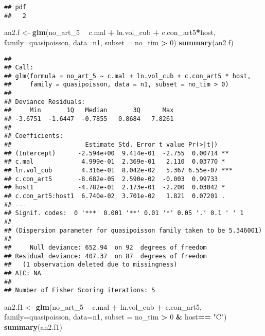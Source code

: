 \documentclass[]{article}
\newenvironment{Shaded}{\begin{snugshade}}{\end{snugshade}}
\newcommand{\KeywordTok}[1]{\textcolor[rgb]{0.13,0.29,0.53}{\textbf{#1}}}
\newcommand{\DataTypeTok}[1]{\textcolor[rgb]{0.13,0.29,0.53}{#1}}
\newcommand{\DecValTok}[1]{\textcolor[rgb]{0.00,0.00,0.81}{#1}}
\newcommand{\StringTok}[1]{\textcolor[rgb]{0.31,0.60,0.02}{#1}}
\newcommand{\OperatorTok}[1]{\textcolor[rgb]{0.81,0.36,0.00}{\textbf{#1}}}
\newcommand{\NormalTok}[1]{#1}
\begin{document}
\begin{verbatim}
## pdf 
##   2
\end{verbatim}

\begin{Shaded}
\begin{Highlighting}[]
\NormalTok{an2.f <-}\StringTok{ }\KeywordTok{glm}\NormalTok{(no_art_}\DecValTok{5} \OperatorTok{~}\StringTok{ }\NormalTok{c.mal }\OperatorTok{+}\StringTok{ }\NormalTok{ln.vol_cub }\OperatorTok{+}\StringTok{ }\NormalTok{c.con_art5}\OperatorTok{*}\NormalTok{host,}
           \DataTypeTok{family=}\NormalTok{quasipoisson, }\DataTypeTok{data=}\NormalTok{n1, }\DataTypeTok{subset =}\NormalTok{ no_tim }\OperatorTok{>}\StringTok{ }\DecValTok{0}\NormalTok{)}
\KeywordTok{summary}\NormalTok{(an2.f)}
\end{Highlighting}
\end{Shaded}

\begin{verbatim}
## 
## Call:
## glm(formula = no_art_5 ~ c.mal + ln.vol_cub + c.con_art5 * host, 
##     family = quasipoisson, data = n1, subset = no_tim > 0)
## 
## Deviance Residuals: 
##     Min       1Q   Median       3Q      Max  
## -3.6751  -1.6447  -0.7855   0.8684   7.8261  
## 
## Coefficients:
##                    Estimate Std. Error t value Pr(>|t|)    
## (Intercept)      -2.594e+00  9.414e-01  -2.755  0.00714 ** 
## c.mal             4.999e-01  2.369e-01   2.110  0.03770 *  
## ln.vol_cub        4.316e-01  8.042e-02   5.367 6.55e-07 ***
## c.con_art5       -8.682e-05  2.590e-02  -0.003  0.99733    
## host1            -4.782e-01  2.173e-01  -2.200  0.03042 *  
## c.con_art5:host1  6.740e-02  3.701e-02   1.821  0.07201 .  
## ---
## Signif. codes:  0 '***' 0.001 '**' 0.01 '*' 0.05 '.' 0.1 ' ' 1
## 
## (Dispersion parameter for quasipoisson family taken to be 5.346001)
## 
##     Null deviance: 652.94  on 92  degrees of freedom
## Residual deviance: 407.37  on 87  degrees of freedom
##   (1 observation deleted due to missingness)
## AIC: NA
## 
## Number of Fisher Scoring iterations: 5
\end{verbatim}

\begin{Shaded}
\begin{Highlighting}[]
\NormalTok{an2.f1 <-}\StringTok{ }\KeywordTok{glm}\NormalTok{(no_art_}\DecValTok{5} \OperatorTok{~}\StringTok{ }\NormalTok{c.mal }\OperatorTok{+}\StringTok{ }\NormalTok{ln.vol_cub }\OperatorTok{+}\StringTok{ }\NormalTok{c.con_art5,}
           \DataTypeTok{family=}\NormalTok{quasipoisson, }\DataTypeTok{data=}\NormalTok{n1, }\DataTypeTok{subset =}\NormalTok{ no_tim }\OperatorTok{>}\StringTok{ }\DecValTok{0} \OperatorTok{&}\StringTok{ }\NormalTok{host}\OperatorTok{==}\StringTok{ "C"}\NormalTok{)}
\KeywordTok{summary}\NormalTok{(an2.f1)}
\end{Highlighting}
\end{Shaded}
\end{document}
